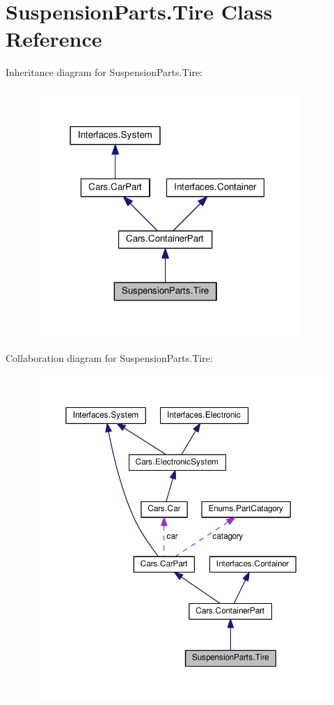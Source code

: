 \hypertarget{classSuspensionParts_1_1Tire}{}\section{Suspension\+Parts.\+Tire Class Reference}
\label{classSuspensionParts_1_1Tire}


Inheritance diagram for Suspension\+Parts.\+Tire\+:
\nopagebreak
\begin{figure}[H]
\begin{center}
\leavevmode
\includegraphics[width=289pt]{classSuspensionParts_1_1Tire__inherit__graph}
\end{center}
\end{figure}


Collaboration diagram for Suspension\+Parts.\+Tire\+:
\nopagebreak
\begin{figure}[H]
\begin{center}
\leavevmode
\includegraphics[width=350pt]{classSuspensionParts_1_1Tire__coll__graph}
\end{center}
\end{figure}
